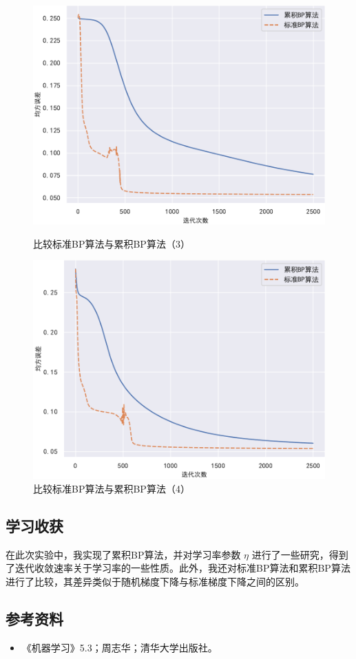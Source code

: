 \documentclass{ctexart}
\begin{document}
\begin{figure}[!htb]
		\begin{minipage}{0.49\linewidth}
			\centering
			\includegraphics[width=\textwidth]{../image/比较3.pdf}
			\caption{比较标准BP算法与累积BP算法（3）}
			\label{比较3}%
		\end{minipage}
		\begin{minipage}{0.49\linewidth}
			\centering
			\includegraphics[width=\textwidth]{../image/比较4.pdf}
			\caption{比较标准BP算法与累积BP算法（4）}
			\label{比较4}%
		\end{minipage}
	\end{figure}
	
	\subsection{学习收获}
	
	在此次实验中，我实现了累积BP算法，并对学习率参数 $\eta$ 进行了一些研究，得到了迭代收敛速率关于学习率的一些性质。此外，我还对标准BP算法和累积BP算法进行了比较，其差异类似于随机梯度下降与标准梯度下降之间的区别。
	
	\subsection{参考资料}
	
	\begin{itemize}
		\item 《机器学习》5.3；周志华；清华大学出版社。
	\end{itemize}
	
\end{document}
